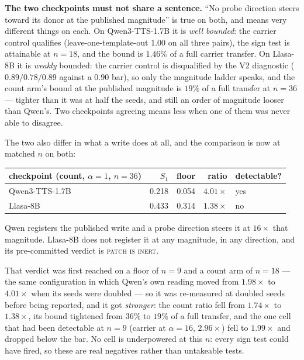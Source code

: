 \documentclass[11pt]{article}
\begin{document}
\textbf{The two checkpoints must not share a sentence.} ``No probe direction
steers toward its donor at the published magnitude'' is true on both, and means
very different things on each. On Qwen3-TTS-1.7B it is \emph{well bounded}: the
carrier control qualifies (leave-one-template-out $1.00$ on all three pairs), the
sign test is attainable at $n{=}18$, and the bound is $1.46\%$ of a full carrier
transfer. On Llasa-8B it is \emph{weakly} bounded: the carrier control is
disqualified by the V2 diagnostic ($0.89 / 0.78 / 0.89$ against a $0.90$ bar), so
only the magnitude ladder speaks, and the count arm's bound at the published
magnitude is $19\%$ of a full transfer at $n{=}36$ --- tighter than it was at
half the seeds, and still an order of magnitude looser than Qwen's. Two checkpoints agreeing means less when one of them
was never able to disagree.

The two also differ in what a write does at all, and the comparison is now at
matched $n$ on both:

\begin{center}
\begin{tabular}{@{}lrrrl@{}}
\toprule
checkpoint (count, $\alpha{=}1$, $n{=}36$) & $S_1$ & floor & ratio & detectable? \\
\midrule
Qwen3-TTS-1.7B & 0.218 & 0.054 & $4.01\times$ & yes \\
Llasa-8B       & 0.433 & 0.314 & $1.38\times$ & no \\
\bottomrule
\end{tabular}
\end{center}

\noindent Qwen registers the published write and a probe direction steers it at
$16\times$ that magnitude. Llasa-8B does not register it at any magnitude, in any
direction, and its pre-committed verdict is \textsc{patch is inert}.

That verdict was first reached on a floor of $n{=}9$ and a count arm of $n{=}18$
--- the same configuration in which Qwen's own reading moved from $1.98\times$ to
$4.01\times$ when its seeds were doubled --- so it was re-measured at doubled
seeds before being reported, and it got \emph{stronger}: the count ratio fell
from $1.74\times$ to $1.38\times$, its bound tightened from $36\%$ to $19\%$ of a
full transfer, and the one cell that had been detectable at $n{=}9$ (carrier at
$\alpha{=}16$, $2.96\times$) fell to $1.99\times$ and dropped below the bar. No
cell is underpowered at this $n$: every sign test could have fired, so these are
real negatives rather than untakeable tests.
\end{document}
